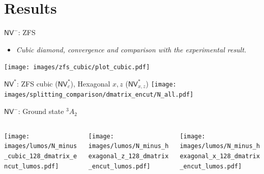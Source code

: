\documentclass[notes=show]{beamer}
\begin{document}

\section{Results} %

\begin{frame}{$ \mathsf{NV}^{-} $: ZFS }
  \begin{itemize}
    \item
      \textit{Cubic diamond, convergence and comparison with the experimental result.}
  \end{itemize}
  \texttt{[image: images/zfs\_cubic/plot\_cubic.pdf]}
\end{frame}

\begin{frame}{$ \mathsf{NV}^{*} $: ZFS cubic ($ \mathsf{NV}^{*}_{c} $), Hexagonal $ x,z $ ($ \mathsf{NV}_{x,z}^{*} $)   }
  \texttt{[image: images/splitting\_comparison/dmatrix\_encut/N\_all.pdf]}
\end{frame}

\begin{frame}{ $ \mathsf{NV}^{-} $: Ground state $ ^3A_{2} $ }
  \begin{center}
    \begin{columns}
      \begin{column}{0.3\textwidth}
        \texttt{[image: images/lumos/N\_minus\_cubic\_128\_dmatrix\_encut\_lumos.pdf]}
      \end{column}
      \begin{column}{0.3\textwidth}
        \texttt{[image: images/lumos/N\_minus\_hexagonal\_z\_128\_dmatrix\_encut\_lumos.pdf]}
      \end{column}
      \begin{column}{0.3\textwidth}
        \texttt{[image: images/lumos/N\_minus\_hexagonal\_x\_128\_dmatrix\_encut\_lumos.pdf]}
      \end{column}
    \end{columns}
  \end{center}
\end{frame}
\end{document}
